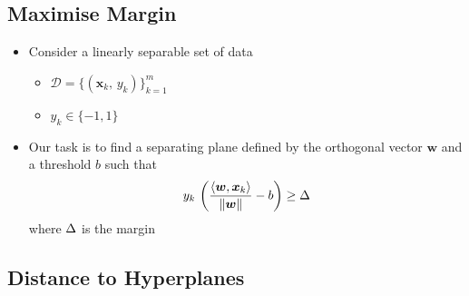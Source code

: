 
\begin{slide}
\section{Maximise Margin}

\begin{PauseHighLight}
  \begin{itemize}
  \item Consider a linearly separable set of data
    \begin{itemize}
    \item $\mathcal{D} = \{(\bm{x}_k,\,y_k)\}_{k=1}^m$
    \item $y_k\in \{-1,1\}$\pause
    \end{itemize}
  \item Our task is to find a separating plane defined by the orthogonal
    vector $\bm{w}$ and a threshold $b$ such that
    \begin{align*}
      y_k\,\left(\frac{\left\langle {\bm{w}}, {\bm{x}_k}\right\rangle}{\| \bm{w} \|} - b\right)
      \geq \Delta
    \end{align*}
    where $\Delta$ is the margin\pause
  \end{itemize}
\end{PauseHighLight}

\end{slide}


\begin{slide}
\section[-1]{Distance to Hyperplanes}

\pb\pause{}
\begin{center}
  \pause
\end{center}
\end{slide}


